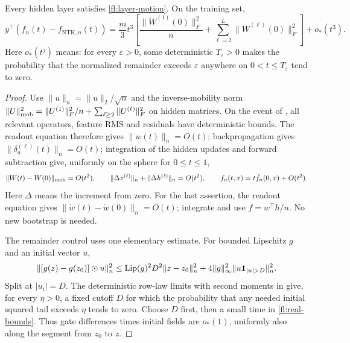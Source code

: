 \begin{lemma}
\label{fl:strong-time}
Every hidden layer satisfies \eqref{fl:layer-motion}. On the training set,
\begin{equation}
 y^\top(f_n(t)-f_{\mathrm{NTK},n}(t))
  =\frac m3t^3\left[\frac{\|\ddot W^{(1)}(0)\|_F^2}{n}
                 +\sum_{\ell=2}^L\|\ddot W^{(\ell)}(0)\|_F^2\right]+o_*(t^3).
 \label{fl:cubic-identity}
\end{equation}
Here $o_*(t^j)$ means: for every $\varepsilon>0$, some deterministic
$T_\varepsilon>0$ makes the probability that the normalized remainder
exceeds $\varepsilon$ anywhere on $0<t\le T_\varepsilon$ tend to zero.
\end{lemma}
\begin{proof}
Use $\|u\|_n=\|u\|_2/\sqrt n$ and the inverse-mobility norm
$\|U\|_{\rm mob}^2=\|U^{(1)}\|_F^2/n+\sum_{\ell\ge2}\|U^{(\ell)}\|_F^2$
on hidden matrices. On the event of , all relevant operators,
feature RMS and residuals have deterministic bounds. The readout equation
therefore gives $\|w(t)\|_n=O(t)$; backpropagation gives
$\|\delta_a^{(\ell)}(t)\|_n=O(t)$; integration of the hidden updates and
forward subtraction give, uniformly on the sphere for $0\le t\le1$,
\begin{equation}
 \|W(t)-W(0)\|_{\rm mob}=O(t^2),\qquad
 \|\Delta z^{(\ell)}\|_n+\|\Delta h^{(\ell)}\|_n=O(t^2),\qquad
 f_n(t,x)=t\dot f_n(0,x)+O(t^2).
 \label{fl:real-bounds}
\end{equation}
Here $\Delta$ means the increment from zero. For the last assertion,
the readout equation gives $\|\dot w(t)-\dot w(0)\|_n=O(t)$; integrate
and use $f=w^\top h/n$. No new bootstrap is needed.

The remainder control uses one elementary estimate. For bounded Lipschitz
$g$ and an initial vector $u$,
\begin{equation}
 \|[g(z)-g(z_0)]\od u\|_n^2
 \le\operatorname{Lip}(g)^2D^2\|z-z_0\|_n^2
       +4\|g\|_\infty^2\|u\mathbf1_{|u|>D}\|_n^2.
 \label{fl:multiplier}
\end{equation}
Split at $|u_i|=D$. The deterministic row-law limits with second moments
in  give, for every $\eta>0$, a fixed cutoff
$D$ for which the probability that any needed initial squared tail exceeds
$\eta$ tends to zero. Choose $D$ first, then a small time in
\eqref{fl:real-bounds}. Thus gate differences times initial fields are
$o_*(1)$, uniformly also along the segment from $z_0$ to $z$.


\end{proof}
